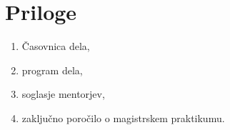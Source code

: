 \chapter{Priloge}\label{cha:priloga}
    
    \begin{enumerate}
        \item Časovnica dela,
        \item program dela,
        \item soglasje mentorjev,
        \item zaključno poročilo o magistrskem praktikumu.
    \end{enumerate}

